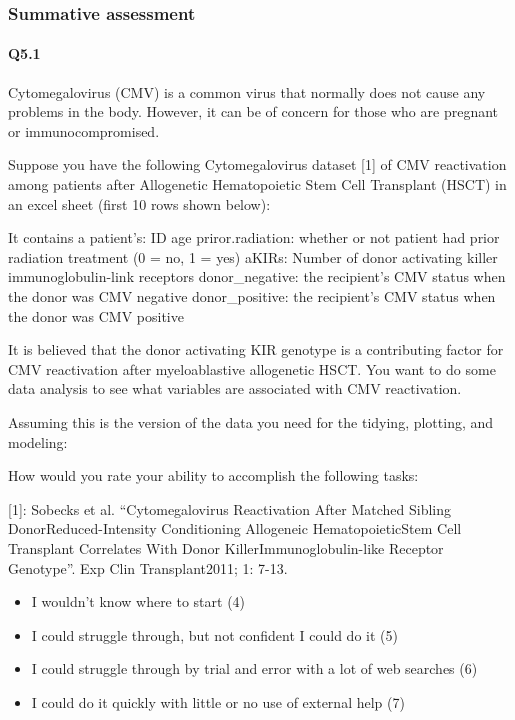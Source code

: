 \documentclass[030-workshop.tex]{subfiles}
\begin{document}
\subsubsection{Summative assessment}

    \paragraph{Q5.1}

    Cytomegalovirus (CMV) is a common virus that normally does not cause any
    problems in the body. However, it can be of concern for those who are
    pregnant or immunocompromised.

    Suppose you have the following Cytomegalovirus dataset [1] of CMV reactivation
    among patients after Allogenetic Hematopoietic Stem Cell Transplant (HSCT) in an
    excel sheet (first 10 rows shown below):

    It contains a patient's: ID age priror.radiation: whether or not patient had
    prior radiation treatment (0 = no, 1 = yes) aKIRs: Number of donor activating
    killer immunoglobulin-link receptors donor\_negative: the recipient's CMV status
    when the donor was CMV negative donor\_positive: the recipient's CMV status when
    the donor was CMV positive

    It is believed that the donor activating KIR genotype is a contributing factor
    for CMV reactivation after myeloablastive allogenetic HSCT. You want to do some
    data analysis to see what variables are associated with CMV reactivation.

    Assuming this is the version of the data you need for the tidying, plotting, and
    modeling:

    How would you rate your ability to accomplish the following tasks:

    [1]: Sobecks et al. ``Cytomegalovirus Reactivation After Matched Sibling
    DonorReduced-Intensity Conditioning Allogeneic HematopoieticStem Cell Transplant
    Correlates With Donor KillerImmunoglobulin-like Receptor Genotype''. Exp Clin
    Transplant2011; 1: 7-13.

    \begin{itemize}
        \item I wouldn’t know where to start (4)
        \item I could struggle through, but not confident I could do it (5)
        \item I could struggle through by trial and error with a lot of web searches (6)
        \item I could do it quickly with little or no use of external help (7)
    \end{itemize}
\end{document}
